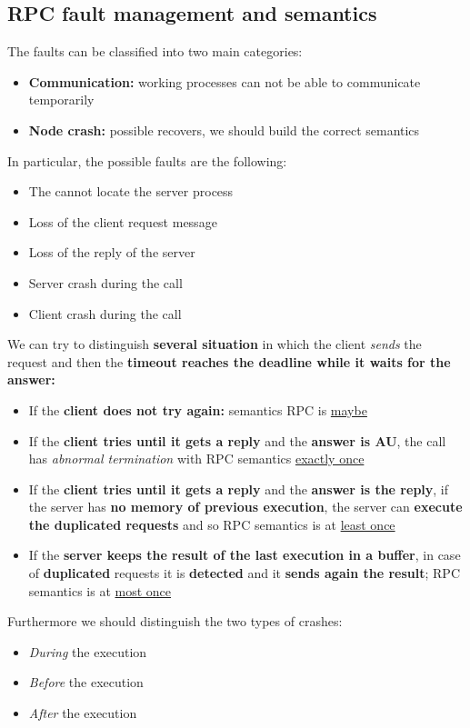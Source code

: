 \subsection{RPC fault management and semantics}
The faults can be classified into two main categories:
\begin{itemize}
    \item \textbf{Communication:} working processes can not be able to communicate temporarily
    \item \textbf{Node crash:} possible recovers, we should build the correct semantics
\end{itemize}
In particular, the possible faults are the following:
\begin{itemize}
    \item The cannot locate the server process
    \item Loss of the client request message
    \item Loss of the reply of the server
    \item Server crash during the call
    \item Client crash during the call
\end{itemize}
We can try to distinguish \textbf{several situation} in which the client \textit{sends} the request and then the \textbf{timeout reaches the deadline while it waits for the answer:}
\begin{itemize}
    \item If the \textbf{client does not try again:} semantics RPC is \underline{maybe}
    \item If the \textbf{client tries until it gets a reply} and the \textbf{answer is AU}, the call has \textit{abnormal termination} with RPC semantics \underline{exactly once}
    \item If the \textbf{client tries until it gets a reply} and the \textbf{answer is the reply}, if the server has \textbf{no memory of previous execution}, the server can \textbf{execute the duplicated requests} and so RPC semantics is at \underline{least once}
    \item If the \textbf{server keeps the result of the last execution in a buffer}, in case of \textbf{duplicated} requests it is \textbf{detected} and it \textbf{sends again the result}; RPC semantics is at \underline{most once}
\end{itemize}

Furthermore we should distinguish the two types of crashes: 
\begin{itemize}
    \item \textit{During} the execution
    \item \textit{Before} the execution
    \item \textit{After} the execution
\end{itemize}

